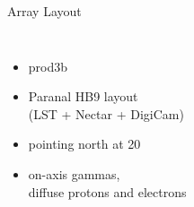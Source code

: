 \documentclass[8pt]{beamer}
\begin{document}
    \begin{frame}
        \titlepage
    \end{frame}


    \begin{frame}{Array Layout}
        \begin{columns}
                \setlength{\figureheight}{\textwidth}
                \setlength{\figurewidth}{\textwidth}
                
                \begin{itemize}
                    \item prod3b
                    \item Paranal HB9 layout\\ (LST + Nectar + DigiCam)
                    \item pointing north at \unit{20}{\degree}
                    \item on-axis gammas,\\ diffuse protons and electrons
                \end{itemize}
        \end{columns}
    \end{frame}
\end{document}
